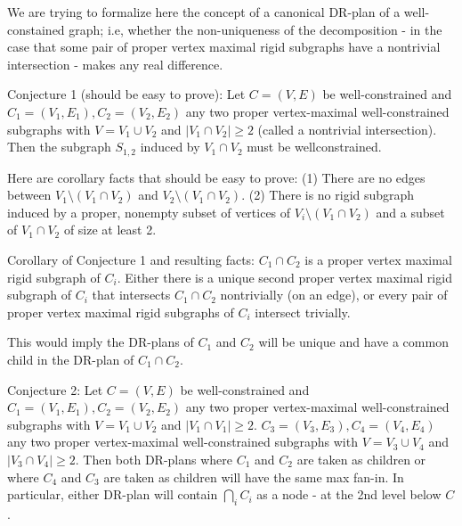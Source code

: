\documentclass[11pt]{article}
\begin{document}
We are trying to formalize here the concept of a canonical DR-plan of a well-constained graph; i.e, whether the non-uniqueness of the decomposition - in the case that some pair of proper vertex maximal rigid subgraphs have a nontrivial intersection - makes any real difference.

Conjecture 1 (should be easy to prove):
Let $C = (V,E)$ be well-constrained and $C_1 =(V_1,E_1),C_2 = (V_2,E_2)$ any two proper vertex-maximal well-constrained subgraphs with $V = V_1\cup V_2$ and $|V_1\cap V_2| \ge 2$ (called a nontrivial intersection). Then the subgraph $S_{1,2}$ induced by $V_1\cap V_2$ must be wellconstrained.


Here are corollary facts that should be easy to prove:
(1) There are no edges between $V_1 \setminus (V_1\cap V_2)$ and $V_2 \setminus (V_1\cap V_2)$.
(2) There is no rigid subgraph induced by a proper, nonempty subset of vertices of   $V_i \setminus (V_1\cap V_2)$ and a subset of $V_1\cap V_2$ of size at least 2.

Corollary of Conjecture 1 and resulting facts:
$C_1\cap C_2$ is a proper vertex maximal rigid subgraph of $C_i$. Either there is a unique second proper vertex maximal rigid subgraph of $C_i$ that intersects  $C_1\cap C_2$  nontrivially (on an edge), or every pair of proper vertex maximal rigid subgraphs of $C_i$ intersect trivially.

This would imply the DR-plans of $C_1$ and $C_2$ will be unique and have a common child in the DR-plan of $C_1\cap C_2$.

Conjecture 2: Let $C = (V,E)$ be well-constrained and $C_1 =(V_1,E_1),C_2 = (V_2,E_2)$ any two proper vertex-maximal well-constrained subgraphs with $V = V_1\cup V_2$ and $|V_1\cap V_1| \ge 2$. $C_3 =(V_3,E_3),C_4 = (V_4,E_4)$ any two proper vertex-maximal well-constrained subgraphs with $V = V_3\cup V_4$ and $|V_3\cap V_4| \ge 2$. Then both DR-plans where $C_1$ and $C_2$ are taken as children or where $C_4$ and $C_3$ are taken as children will have the same max fan-in. In particular, either DR-plan will contain $\bigcap\limits_i C_i$ as a node - at the 2nd level below $C$.



\end{document}
